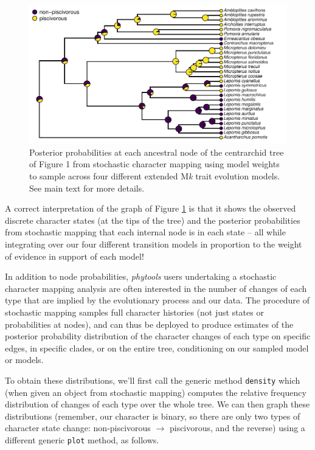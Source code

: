 \documentclass[fleqn,10pt,lineno]{wlpeerj} %
\begin{document}
\begin{figure}
\includegraphics[width=1\linewidth]{Revell.phytools-v2_peerj_files/figure-latex/posterior-probs-1} \caption{Posterior probabilities at each ancestral node of the centrarchid tree of Figure 1 from stochastic character mapping using model weights to sample across four different extended M\textit{k} trait evolution models. See main text for more details.}\label{fig:posterior-probs}
\end{figure}

A correct interpretation of the graph of Figure \ref{fig:posterior-probs} is that it shows the observed discrete character states (at the tips of the tree) and the posterior probabilities from stochastic mapping that each internal node is in each state -- all while integrating over our four different transition models in proportion to the weight of evidence in support of each model!

In addition to node probabilities, \emph{phytools} users undertaking a stochastic character mapping analysis are often interested in the number of changes of each type that are implied by the evolutionary process and our data. The procedure of stochastic mapping samples full character histories (not just states or probabilities at nodes), and can thus be deployed to produce estimates of the posterior probability distribution of the character changes of each type on specific edges, in specific clades, or on the entire tree, conditioning on our sampled model or models.

To obtain these distributions, we'll first call the generic method \texttt{density} which (when given an object from stochastic mapping) computes the relative frequency distribution of changes of each type over the whole tree. We can then graph these distributions (remember, our character is binary, so there are only two types of character state change: non-piscivorous \(\rightarrow\) piscivorous, and the reverse) using a different generic \texttt{plot} method, as follows.
\end{document}
